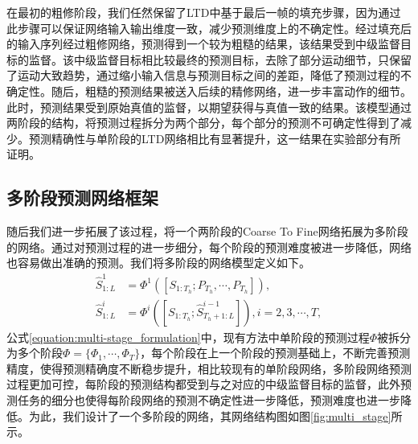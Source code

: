 在最初的粗修阶段，我们任然保留了LTD中基于最后一帧的填充步骤，因为通过此步骤可以保证网络输入输出维度一致，减少预测维度上的不确定性。经过填充后的输入序列经过粗修网络，预测得到一个较为粗糙的结果，该结果受到中级监督目标的监督。该中级监督目标相比较最终的预测目标，去除了部分运动细节，只保留了运动大致趋势，通过缩小输入信息与预测目标之间的差距，降低了预测过程的不确定性。随后，粗糙的预测结果被送入后续的精修网络，进一步丰富动作的细节。此时，预测结果受到原始真值的监督，以期望获得与真值一致的结果。该模型通过两阶段的结构，将预测过程拆分为两个部分，每个部分的预测不可确定性得到了减少。预测精确性与单阶段的LTD网络相比有显著提升，这一结果在实验部分有所证明。
\subsection{多阶段预测网络框架}
随后我们进一步拓展了该过程，将一个两阶段的Coarse To Fine网络拓展为多阶段的网络。通过对预测过程的进一步细分，每个阶段的预测难度被进一步降低，网络也容易做出准确的预测。我们将多阶段的网络模型定义如下。
\begin{equation}
    \begin{aligned}
         \hat{S}_{1:L}^{1} &= \Phi^1([{S}_{1:T_h};P_{T_h},\cdots,P_{T_h}]), \\
        \hat{S}_{1:L}^{i} &= \Phi^i([S_{1:T_h};\hat{S}_{T_h+1:L}^{i-1}]), i = {2,3,\cdots,T},
    \end{aligned}
    \label{equation:multi-stage_formulation}
\end{equation}
公式\ref{equation:multi-stage_formulation}中，现有方法中单阶段的预测过程$\Phi$被拆分为多个阶段$\Phi = \{ \Phi_1, \cdots, \Phi_T\}$，每个阶段在上一个阶段的预测基础上，不断完善预测精度，使得预测精确度不断稳步提升，相比较现有的单阶段网络，多阶段网络预测过程更加可控，每阶段的预测结构都受到与之对应的中级监督目标的监督，此外预测任务的细分也使得每阶段网络的预测不确定性进一步降低，预测难度也进一步降低。为此，我们设计了一个多阶段的网络，其网络结构图如图\ref{fig:multi_stage}所示。

